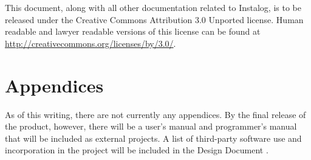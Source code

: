 \documentclass[letterpaper,12pt]{article}
\begin{document}
This document, along with all other documentation related to Instalog,  is to be
released under the Creative Commons Attribution 3.0 Unported license. Human
readable and lawyer readable versions of this license can be found at
\url{http://creativecommons.org/licenses/by/3.0/}.

\newpage



\section{Appendices} \label{appendices}
As of this writing, there are not currently any appendices.  By the final
release of the product, however, there will be a user's manual and programmer's
manual that will be included as external projects.  A list of third-party
software use and incorporation in the project will be included in the Design
Document \cite{Design}.  

\newpage



{} 


\newpage
\end{document}
